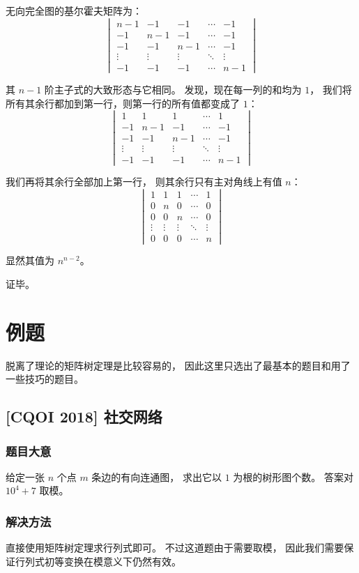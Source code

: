 \documentclass[UTF8]{article}
\begin{document}
	\bigskip

	无向完全图的基尔霍夫矩阵为：
	\begin{equation*}
		\begin{vmatrix}
			n - 1 & -1 & -1 & \cdots & -1
			\\
			-1 & n - 1 & -1 & \cdots & -1
			\\
			-1 & -1 & n - 1 & \cdots & -1
			\\
			\vdots & \vdots & \vdots & \ddots & \vdots
			\\
			-1 & -1 & -1 & \cdots & n - 1
		\end{vmatrix}
	\end{equation*}

	其 $n - 1$ 阶主子式的大致形态与它相同。
	发现，现在每一列的和均为 $1$，
	我们将所有其余行都加到第一行，则第一行的所有值都变成了 $1$：
	\begin{equation*}
		\begin{vmatrix}
			1 & 1 & 1 & \cdots & 1
			\\
			-1 & n - 1 & -1 & \cdots & -1
			\\
			-1 & -1 & n - 1 & \cdots & -1
			\\
			\vdots & \vdots & \vdots & \ddots & \vdots
			\\
			-1 & -1 & -1 & \cdots & n - 1
		\end{vmatrix}
	\end{equation*}

	我们再将其余行全部加上第一行，
	则其余行只有主对角线上有值 $n$：
	\begin{equation*}
		\begin{vmatrix}
			1 & 1 & 1 & \cdots & 1
			\\
			0 & n & 0 & \cdots & 0
			\\
			0 & 0 & n & \cdots & 0
			\\
			\vdots & \vdots & \vdots & \ddots & \vdots
			\\
			0 & 0 & 0 & \cdots & n
		\end{vmatrix}
	\end{equation*}

	显然其值为 $n^{n - 2}$。

	\bigskip

	{\kaishu 证毕。}

	\section{例题}

	脱离了理论的矩阵树定理是比较容易的，
	因此这里只选出了最基本的题目和用了一些技巧的题目。

	\subsection{[CQOI 2018] 社交网络}

	\subsubsection{题目大意}

	给定一张 $n$ 个点 $m$ 条边的有向连通图，
	求出它以 $1$ 为根的树形图个数。
	答案对 $10^4 + 7$ 取模。

	\subsubsection{解决方法}

	直接使用矩阵树定理求行列式即可。
	不过这道题由于需要取模，
	因此我们需要保证行列式初等变换在模意义下仍然有效。

	
\end{document}
